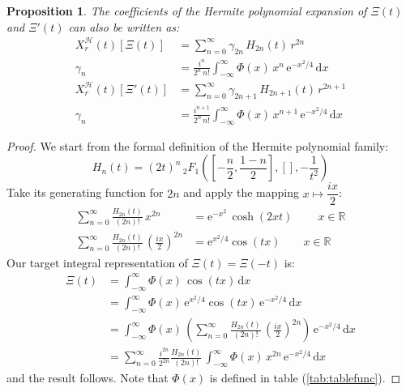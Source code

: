 \documentclass[a4paper,11pt,twoside]{amsart}
\newtheorem{proposition}[theorem]{Proposition}
\newcommand{\verifiedeq}{=}
\newcommand{\defeq}{=}
\newcommand{\verifiedeq}{\stackrel{\checkmark}{=}}
\newcommand{\defeq}{\stackrel{\scriptscriptstyle \textnormal{def}}{=}}
\begin{document}
\begin{proposition}
The coefficients of the Hermite polynomial expansion of $\Xi(t)$ and $\Xi'(t)$ can also be written as: 
\begin{align}
X^{\mathcal{H}}_r(t)\left[\Xi(t)\right] &\verifiedeq \sum_{n=0}^\infty \gamma_{2n}\,H_{2n}(t)\,r^{2n} \label{herm1}\\ 
\gamma_n &\verifiedeq \frac{i^n}{2^{n}\,n!}\int_{-\infty}^{\infty} \Phi(x)\,x^n\,\mathrm{e}^{-x^2/4}\,\mathrm{d}x \\
X^{\mathcal{H}}_r(t)\left[\Xi'(t)\right] &\verifiedeq \sum_{n=0}^\infty \gamma_{2n+1}\,H_{2n+1}(t)\,r^{2n+1} \label{herm2}\\ 
\gamma_n &\verifiedeq \frac{i^{n+1}}{2^{n}\,n!}\int_{-\infty}^{\infty} \Phi(x)\,x^{n+1}\,\mathrm{e}^{-x^2/4}\,\mathrm{d}x
\end{align}
\end{proposition}
\begin{proof}
We start from the formal definition of the Hermite polynomial family:
\begin{equation}
 H_n(t) \defeq (2t)^n\, {}_2F_1\left(\left[-\frac{n}{2}, \frac{1-n}{2}\right],[],-\frac{1}{t^2}\right) 
\end{equation}
Take its generating function for $2n$ and apply the mapping $x \mapsto \dfrac{ix}{2}$:
\begin{align}
 \sum_{n=0}^\infty \frac{H_{2n}(t)}{(2n)!}\, x^{2n} &\verifiedeq \mathrm{e}^{-x^2}\,\cosh(2xt) \ \qquad x \in \mathbb{R} \\
 \sum_{n=0}^\infty \frac{H_{2n}(t)}{(2n)!}\,\left(\frac{ix}{2}\right)^{2n} &\verifiedeq  \mathrm{e}^{x^2/4} \cos(tx)\qquad x \in \mathbb{R}
\end{align}
Our target integral representation of $\Xi(t) = \Xi(-t)$ is:
\begin{align}
 \Xi(t) &\verifiedeq \int_{-\infty}^\infty \Phi(x)\,\cos(tx)\, \mathrm{d}x \\
  & \verifiedeq \int_{-\infty}^\infty \Phi(x)\,\mathrm{e}^{x^2/4}\cos(tx)\,\mathrm{e}^{-x^2/4}\,\mathrm{d}x \\
  & \verifiedeq \int_{-\infty}^\infty \Phi(x)\,\left(\sum_{n=0}^\infty \frac{H_{2n}(t)}{(2n)!}\,\left(\frac{ix}{2}\right)^{2n} \right)\,\mathrm{e}^{-x^2/4}\,\mathrm{d}x \\
  & \verifiedeq \sum_{n=0}^\infty \frac{i^{2n}}{2^{2n}}\frac{H_{2n}(t)}{(2n)!}\,\int_{-\infty}^\infty \Phi(x)\,x^{2n}\,\mathrm{e}^{-x^2/4}\,\mathrm{d}x
\end{align}
and the result follows. Note that $\Phi(x)$ is defined in table (\ref{tab:tablefunc}).
\end{proof}
\end{document}
